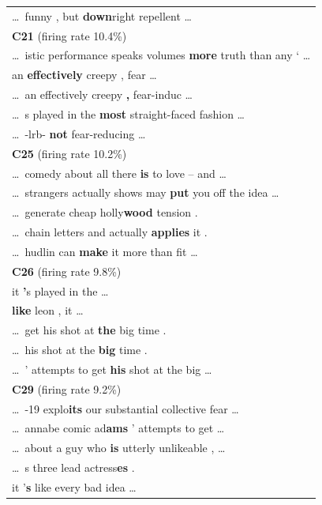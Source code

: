 \begin{longtable}{@{}>{\ttfamily}p{\linewidth}@{}}
    \dots\ funny , but\textbf{ down}right repellent \dots\\
    \addlinespace
    {\normalfont\textbf{C21} \hfill (firing rate 10.4\%)}\\
    \cmidrule(){1-1}
    \dots\ istic performance speaks volumes\textbf{ more} truth than any ` \dots\\
    an\textbf{ effectively} creepy , fear \dots\\
    \dots\ an effectively creepy\textbf{ ,} fear-induc \dots\\
    \dots\ s played in the\textbf{ most} straight-faced fashion \dots\\
    \dots\ -lrb-\textbf{ not} fear-reducing \dots\\
    \addlinespace
    {\normalfont\textbf{C25} \hfill (firing rate 10.2\%)}\\
    \cmidrule(){1-1}
    \dots\ comedy about all there\textbf{ is} to love -- and \dots\\
    \dots\ strangers actually shows may\textbf{ put} you off the idea \dots\\
    \dots\ generate cheap holly\textbf{wood} tension .\\
    \dots\ chain letters and actually\textbf{ applies} it .\\
    \dots\ hudlin can\textbf{ make} it more than fit \dots\\
    \addlinespace
    {\normalfont\textbf{C26} \hfill (firing rate 9.8\%)}\\
    \cmidrule(){1-1}
    it\textbf{ '}s played in the \dots\\
    \textbf{like} leon , it \dots\\
    \dots\ get his shot at\textbf{ the} big time .\\
    \dots\ his shot at the\textbf{ big} time .\\
    \dots\ ' attempts to get\textbf{ his} shot at the big \dots\\
    \addlinespace
    {\normalfont\textbf{C29} \hfill (firing rate 9.2\%)}\\
    \cmidrule(){1-1}
    \dots\ -19 explo\textbf{its} our substantial collective fear \dots\\
    \dots\ annabe comic ad\textbf{ams} ' attempts to get \dots\\
    \dots\ about a guy who\textbf{ is} utterly unlikeable , \dots\\
    \dots\ s three lead actress\textbf{es} .\\
    it '\textbf{s} like every bad idea \dots\\

\end{longtable}
